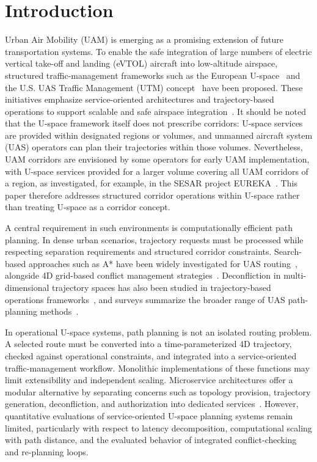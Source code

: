 \section{Introduction}
\label{sec:introduction}

Urban Air Mobility (UAM) is emerging as a promising extension of future transportation systems. To enable the safe integration of large numbers of electric vertical take-off and landing (eVTOL) aircraft into low-altitude airspace, structured traffic-management frameworks such as the European U-space~\cite{eu_commission_2017,easa2020uspace} and the U.S. UAS Traffic Management (UTM) concept~\cite{kopardekar2016utm} have been proposed. These initiatives emphasize service-oriented architectures and trajectory-based operations to support scalable and safe airspace integration~\cite{sesar_conops_2019,sesar_master_plan_2025}. It should be noted that the U-space framework itself does not prescribe corridors: U-space services are provided within designated regions or volumes, and unmanned aircraft system (UAS) operators can plan their trajectories within those volumes. Nevertheless, UAM corridors are envisioned by some operators for early UAM implementation, with U-space services provided for a larger volume covering all UAM corridors of a region, as investigated, for example, in the SESAR project EUREKA~\cite{sesar_eureka_project}. This paper therefore addresses structured corridor operations within U-space rather than treating U-space as a corridor concept.

A central requirement in such environments is computationally efficient path planning. In dense urban scenarios, trajectory requests must be processed while respecting separation requirements and structured corridor constraints. Search-based approaches such as A* have been widely investigated for UAS routing~\cite{sahawneh2016_3d_path_planning,a_star_2d3d_comparison_utm}, alongside 4D grid-based conflict management strategies~\cite{acevedo_4d_grids_u_space}. Deconfliction in multi-dimensional trajectory spaces has also been studied in trajectory-based operations frameworks~\cite{NDMap,enea_porretta_4d_tbo_comparison}, and surveys summarize the broader range of UAS path-planning methods~\cite{ahmad2023_uav_path_planning_survey}.

In operational U-space systems, path planning is not an isolated routing problem. A selected route must be converted into a time-parameterized 4D trajectory, checked against operational constraints, and integrated into a service-oriented traffic-management workflow. Monolithic implementations of these functions may limit extensibility and independent scaling. Microservice architectures offer a modular alternative by separating concerns such as topology provision, trajectory generation, deconfliction, and authorization into dedicated services~\cite{dragoni2017microservices,matlekovic2020uav}. However, quantitative evaluations of service-oriented U-space planning systems remain limited, particularly with respect to latency decomposition, computational scaling with path distance, and the evaluated behavior of integrated conflict-checking and re-planning loops.

